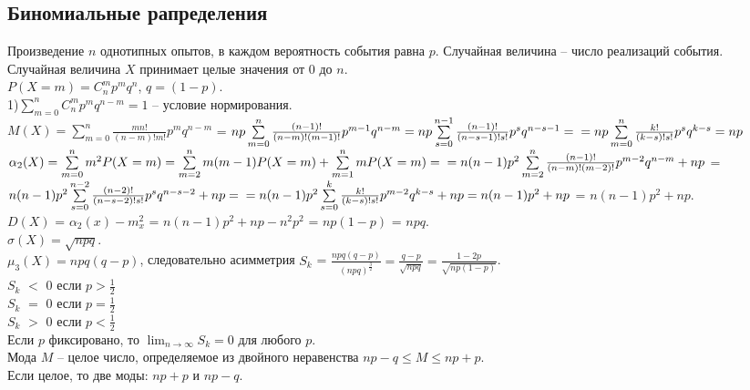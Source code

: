 \documentclass[russian, 12pt, fleqn]{article}
\begin{document}
\subsection{Биномиальные рапределения}
Произведение $n$ однотипных опытов, в каждом вероятность события равна $p$. Случайная величина -- число реализаций события.\\
Случайная величина $X$ принимает целые значения от $0$ до $n$.\\
$P(X=m)=C^m_np^mq^n$, $q  = (1 - p)$.\\
1)$\sum\limits_{m=0}^{n}C_n^mp^mq^{n-m} = 1$ -- условие нормирования.\\
$M(X) = \sum\limits_{m=0}^{n} \frac{mn!}{(n-m)!m!}p^mq^{n-m}$ = $np\sum\limits_{m=0}^{n}\frac{(n-1)!}{(n-m)!(m-1)!}p^{m-1}q^{n-m} = np\sum\limits_{s=0}^{n - 1} \frac{(n-1)!}{(n-s-1)!s!}p^sq^{n-s-1} =\\= np\sum\limits_{m=0}^{n}\frac{k!}{(k-s)!s!}p^sq^{k-s} = np$\\
$\alpha_2(X)=\sum\limits_{m=0}^{n}m^2P(X=m) = \sum\limits_{m=2}^{n} m(m-1)P(X=m) + \sum\limits_{m=1}^{n}mP(X=m)=\\= n(n-1)p^2\sum\limits_{m=2}^{n}\frac{(n-1)!}{(n-m)!(m-2)!}p^{m-2}q^{n-m} + np$ = $n(n-1)p^2\sum\limits_{s=0}^{n-2}\frac{(n-2)!}{(n-s-2)!s!}p^sq^{n-s-2}+np =\\= n(n-1)p^2\sum\limits_{s = 0}^{k}\frac{k!}{(k-s)!s!}p^{m-2}q^{k-s} + np = n(n-1)p^2 + np$ = $n(n-1)p^2 + np$.\\
$D(X)$ = $\alpha_2(x) - m_x^2$ =  $n(n - 1)p^2 + np - n^2p^2$ = $np(1-p)$ = $npq$.\\
$\sigma(X) = \sqrt{npq}$.\\
$\mu_3(X) = npq(q-p)$, следовательно асимметрия $S_k$ = $\frac{npq(q-p)}{(npq)^{\frac{3}{2}}} = \frac{q-p}{\sqrt{npq}} = \frac{1-2p}{\sqrt{np(1-p)}}$.\\
$S_k$ $<$ $0$ если $p>\frac{1}{2}$\\
$S_k$ $=$ $0$ если $p=\frac{1}{2}$\\
$S_k$ $>$ $0$ если $p<\frac{1}{2}$\\
Если $p$ фиксировано, то $\displaystyle{ \lim_{n \to{ \infty}}}S_k = 0$ для любого $p$.\\
Мода $M$ -- целое число, определяемое из двойного неравенства $np-q \leq M \leq np + p$.\\
Если целое, то две моды: $np+p$ и $np-q$.\\
\end{document}
